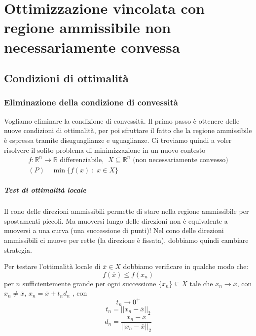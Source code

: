 

\inbpdocument 


\chapter{Ottimizzazione vincolata con regione  ammissibile  non necessariamente convessa}

\section{Condizioni di ottimalit\`a}
\subsection{Eliminazione della  condizione di convessit\`a}
Vogliamo eliminare la condizione di convessit\`a.
Il primo passo \`e ottenere delle nuove condizioni di ottimalit\`a,
per poi sfruttare il fatto che la regione ammissibile \`e espressa
tramite disuguaglianze e uguaglianze.
Ci troviamo quindi a voler risolvere il solito problema di minimizzazione
in un nuovo contesto
$$
\begin{array}{c}
f: \mathbb{R}^{n}\rightarrow \mathbb{R} \text{ differenziabile, }
\; X \subseteq \mathbb{R}^{n} \text{ (non necessariamente convesso)} \\
 (P) \quad \min \{ f(x) \; : \; x \in X \}
\end{array}
$$
\paragraph{Test di ottimalit\`a locale}
Il cono delle direzioni ammissibili permette di stare nella regione
ammissibile per spostamenti piccoli. Ma muoversi lungo delle
direzioni non \`e equivalente a muoversi a una curva (una successione
di punti)!  Nel cono delle direzioni ammissibili ci muove per rette
(la direzione \`e fissata), dobbiamo quindi cambiare strategia.

\begin{center}
\fbox
{
	\begin{minipage}[position]{0.85\textwidth}
Per testare l'ottimalit\`a locale  di $\overline{x} \in X$
dobbiamo verificare in qualche modo che:
$$ f(\overline{x}) \leq f(x_n) $$
per $n$ sufficientemente grande per ogni successione
$\{x_n\} \subseteq X$ tale che $x_n \to \overline{x}$, con
 $x_n \neq \overline{x}$,
$x_n = \overline{x}+t_n d_n$ , con
$$ t_n \rightarrow 0^{+} $$
$$ t_n = ||x_n - \overline{x}||_2$$
$$ d_n = \dfrac{x_n - \overline{x}}{||x_n - \overline{x}||_2}$$
\end{minipage}
}
\end{center}

